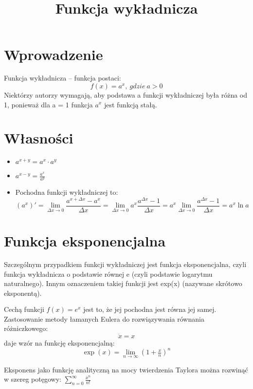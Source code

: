 \documentclass{article}
\begin{document}
\title{Funkcja wykładnicza}
\maketitle

\section*{Wprowadzenie}
Funkcja wykładnicza – funkcja postaci:
$$  f(x)=a^{x}, \: gdzie \: a>0 $$
Niektórzy autorzy wymagają, aby podstawa a funkcji wykładniczej była różna od 1, ponieważ dla  a = 1 funkcja  \( a^{x} \) jest funkcją stałą. 

\section*{Własności}
\begin{itemize}
\item $ a^{x+y}=a^{x}\cdot a^{y} $
\item \begin{math} a^{x-y}={\frac {a^{x}}{a^{y}}} \end{math}
\item Pochodna funkcji wykładniczej to:
\begin{displaymath}
(a^{x})'=\lim _{\Delta x\to 0}{\frac {a^{x+\Delta x}-a^{x}}{\Delta x}}=\lim _{\Delta x\to 0}a^{x}{\frac {a^{\Delta x}-1}{\Delta x}}=a^{x}\lim _{\Delta x\to 0}{\frac {a^{\Delta x}-1}{\Delta x}}=a^{x}\ln a
\end{displaymath}
\end{itemize}

\section*{Funkcja eksponencjalna}
Szczególnym przypadkiem funkcji wykładniczej jest funkcja eksponencjalna, czyli funkcja wykładnicza o podstawie równej e (czyli podstawie logarytmu naturalnego). Innym oznaczeniem takiej funkcji jest exp(x) (nazywane skrótowo eksponentą). 

Cechą funkcji $ f(x)=e^{x} $ jest to, że jej pochodna jest równa jej samej. Zastosowanie metody łamanych Eulera do rozwiązywania równania różniczkowego: 
\begin{equation*}
{\dot  {x}}=x
\end{equation*}
daje wzór na funkcję eksponencjalną: 
$$ \exp(x)=\lim _{n\to \infty }\left(1+{\tfrac {x}{n}}\right)^{n} $$

Eksponens jako funkcję analityczną na mocy twierdzenia Taylora można rozwinąć w szereg potęgowy: \( \sum _{n=0}^{\infty }{\frac {x^{n}}{n!}} \)
\end{document}
